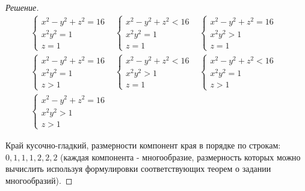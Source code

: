 \documentclass[a5paper]{article}
\theoremstyle{plain}
\theoremstyle{definition}
\numberwithin{through}{section}
\numberwithin{equation}{section}
\begin{document}
\begin{proof}[Решение]
	\begin{align*}
		\begin{cases}
		x^2 - y^2 + z^2 = 16 \\
		x^2 y^2 = 1 \\
		z = 1
		\end{cases} 		
		&	
		\begin{cases}
		x^2 - y^2 + z^2 < 16 \\
		x^2 y^2 = 1 \\
		z = 1
		\end{cases}
		&
		\begin{cases}
		x^2 - y^2 + z^2 = 16 \\
		x^2 y^2 > 1 \\
		z = 1
		\end{cases}	
		& \\
		\begin{cases}
		x^2 - y^2 + z^2 = 16 \\
		x^2 y^2 = 1 \\
		z > 1
		\end{cases}	
		&
		\begin{cases}
		x^2 - y^2 + z^2 < 16 \\
		x^2 y^2 > 1 \\
		z = 1
		\end{cases}	
		&
		\begin{cases}
		x^2 - y^2 + z^2 < 16 \\
		x^2 y^2 = 1 \\
		z > 1
		\end{cases}	
		& \\
		\begin{cases}
		x^2 - y^2 + z^2 = 16 \\
		x^2 y^2 > 1 \\
		z > 1
		\end{cases}	
	\end{align*}
	
	Край кусочно-гладкий, размерности компонент края в порядке по строкам: $0, 1, 1, 1, 2, 2, 2$ (каждая компонента - многообразие, размерность которых можно вычислить используя формулировки соответствующих теорем о задании многообразий).
\end{proof}
\end{document}
